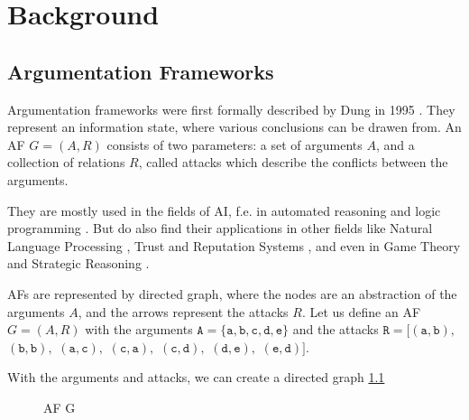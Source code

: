 \chapter{Background}

\section{Argumentation Frameworks}


Argumentation frameworks were first formally described by Dung in 1995 \cite{DUNG1995321}. They represent an information state, where various conclusions can be drawen from. An AF $G = (A, R)$ consists of two parameters: a set of arguments $A$, and a collection of relations $R$, called attacks which describe the conflicts between the arguments.

They are mostly used in the fields of \ac{AI}, f.e. in automated reasoning and logic programming \cite{AFINAIARLP, AFINAIARLPexample}. But do also find their applications in other fields like Natural Language Processing \cite{AFINNLP}, Trust and Reputation Systems \cite{AFINTaRS}, and even in Game Theory and Strategic Reasoning \cite{AFinGames}.

AFs are represented by directed graph, where the nodes are an abstraction of the arguments $A$, and the arrows represent the attacks $R$. Let us define an AF $G = (A, R)$ with the arguments
$\mathtt{A=\{a, b, c, d, e\}}$ and the attacks
$\mathtt{R=[(a,b),}$
$\mathtt{(b,b),}$
$\mathtt{(a,c),}$
$\mathtt{(c,a),}$
$\mathtt{(c,d),}$
$\mathtt{(d,e),}$
$\mathtt{(e,d)]}.$

With the arguments and attacks, we can create a directed graph \ref{af:backgroundAFexample1}
\begin{figure}[h]
    \centering
    \caption{\ac{AF} G}
    \label{af:backgroundAFexample1}
\end{figure}

